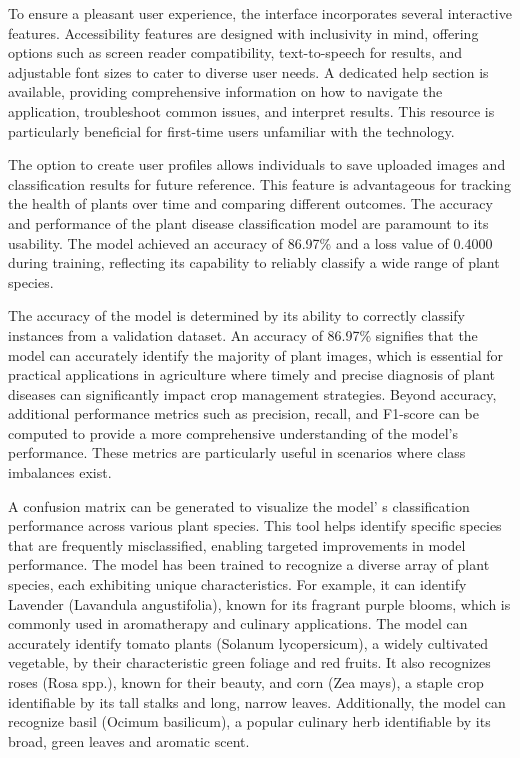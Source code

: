 \begin{multicols}{2}
To ensure a pleasant user experience, the interface incorporates several
interactive features. Accessibility features are designed with
inclusivity in mind, offering options such as screen reader
compatibility, text-to-speech for results, and adjustable font sizes to
cater to diverse user needs. A dedicated help section is available,
providing comprehensive information on how to navigate the application,
troubleshoot common issues, and interpret results. This resource is
particularly beneficial for first-time users unfamiliar with the
technology.

The option to create user profiles allows individuals to save uploaded
images and classification results for future reference. This feature is
advantageous for tracking the health of plants over time and comparing
different outcomes. The accuracy and performance of the plant disease
classification model are paramount to its usability. The model achieved
an accuracy of 86.97\% and a loss value of 0.4000 during training,
reflecting its capability to reliably classify a wide range of plant
species.

The accuracy of the model is determined by its ability to correctly
classify instances from a validation dataset. An accuracy of 86.97\%
signifies that the model can accurately identify the majority of plant
images, which is essential for practical applications in agriculture
where timely and precise diagnosis of plant diseases can significantly
impact crop management strategies. Beyond accuracy, additional
performance metrics such as precision, recall, and F1-score can be
computed to provide a more comprehensive understanding of the model's
performance. These metrics are particularly useful in scenarios where
class imbalances exist.

A confusion matrix can be generated to visualize the
model' s classification performance across various plant
species. This tool helps identify specific species that are frequently
misclassified, enabling targeted improvements in model performance. The
model has been trained to recognize a diverse array of plant species,
each exhibiting unique characteristics. For example, it can identify
Lavender (Lavandula angustifolia), known for its fragrant purple blooms,
which is commonly used in aromatherapy and culinary applications. The
model can accurately identify tomato plants (Solanum lycopersicum), a
widely cultivated vegetable, by their characteristic green foliage and
red fruits. It also recognizes roses (Rosa spp.), known for their
beauty, and corn (Zea mays), a staple crop identifiable by its tall
stalks and long, narrow leaves. Additionally, the model can recognize
basil (Ocimum basilicum), a popular culinary herb identifiable by its
broad, green leaves and aromatic scent.


\end{multicols}
